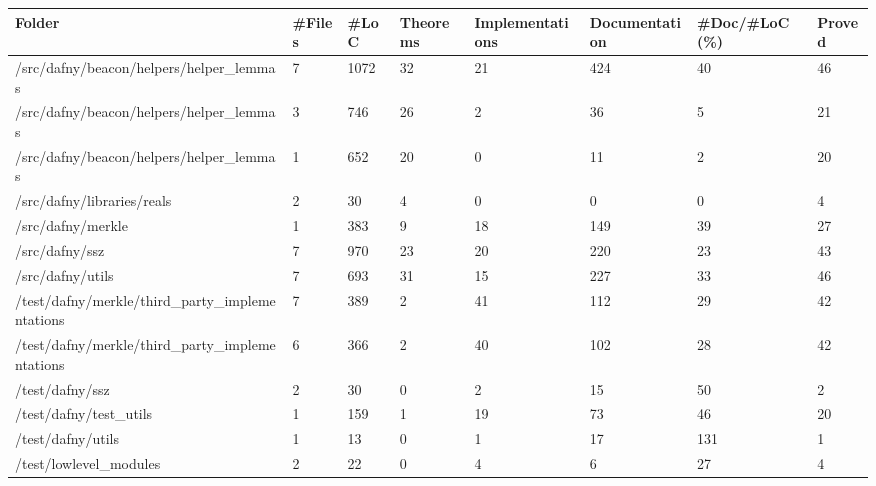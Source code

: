 \documentclass[a4paper, 12pt]{article}
\begin{document}
\vspace{2em}
\begin{tabular}{llllllll}
\toprule
                                         Folder & \#Files &  \#LoC & Theorems & Implementations & Documentation & \#Doc/\#LoC (\%) & Proved \\
\midrule
        /src/dafny/beacon/helpers/helper\_lemmas &      7 &  1072 &       32 &              21 &           424 &            40 &     46 \\
        /src/dafny/beacon/helpers/helper\_lemmas &      3 &   746 &       26 &               2 &            36 &             5 &     21 \\
        /src/dafny/beacon/helpers/helper\_lemmas &      1 &   652 &       20 &               0 &            11 &             2 &     20 \\
                     /src/dafny/libraries/reals &      2 &    30 &        4 &               0 &             0 &             0 &      4 \\
                              /src/dafny/merkle &      1 &   383 &        9 &              18 &           149 &            39 &     27 \\
                                 /src/dafny/ssz &      7 &   970 &       23 &              20 &           220 &            23 &     43 \\
                               /src/dafny/utils &      7 &   693 &       31 &              15 &           227 &            33 &     46 \\
 /test/dafny/merkle/third\_party\_implementations &      7 &   389 &        2 &              41 &           112 &            29 &     42 \\
 /test/dafny/merkle/third\_party\_implementations &      6 &   366 &        2 &              40 &           102 &            28 &     42 \\
                                /test/dafny/ssz &      2 &    30 &        0 &               2 &            15 &            50 &      2 \\
                         /test/dafny/test\_utils &      1 &   159 &        1 &              19 &            73 &            46 &     20 \\
                              /test/dafny/utils &      1 &    13 &        0 &               1 &            17 &           131 &      1 \\
                         /test/lowlevel\_modules &      2 &    22 &        0 &               4 &             6 &            27 &      4 \\
\bottomrule
\end{tabular}
\end{document}
